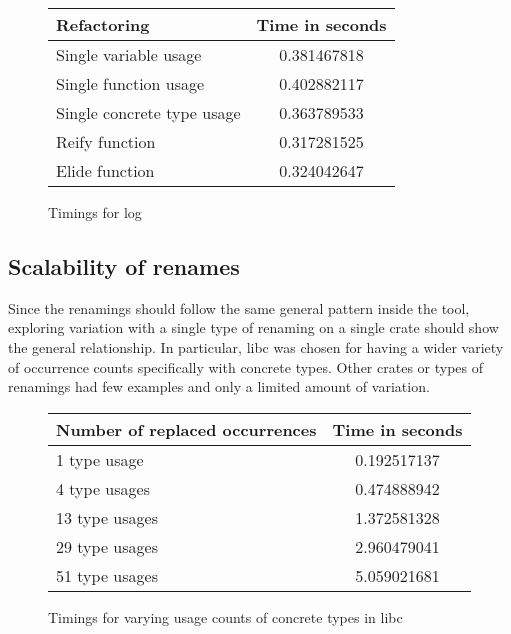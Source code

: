 \begin{figure}[H]
\begin{center}
    \begin{tabular}{ | l | c |}
    \hline
    \textbf{Refactoring} & \textbf{Time in seconds} \\ \hline
    Single variable usage &  0.381467818  \\ \hline
    Single function usage &   0.402882117  \\ \hline
    Single concrete type usage  &  0.363789533 \\ \hline
    Reify function &   0.317281525 \\ \hline
    Elide function &  0.324042647 \\ \hline
    \end{tabular}
\end{center}

\caption{Timings for log}
\label{Fig:log}
\end{figure}

\subsection{Scalability of renames}
Since the renamings should follow the same general pattern inside the tool, exploring variation with a single type of renaming on a single crate should show the general relationship. In particular, libc was chosen for having a wider variety of occurrence counts specifically with concrete types. Other crates or types of renamings had few examples and only a limited amount of variation.

\begin{figure}[H]
\begin{center}
    \begin{tabular}{ | l | c |}
    \hline
    \textbf{Number of replaced occurrences} & \textbf{Time in seconds} \\ \hline
    1 type usage &  0.192517137  \\ \hline
    4 type usages &   0.474888942  \\ \hline
    13 type usages  &  1.372581328 \\ \hline
    29 type usages &  2.960479041  \\ \hline
    51 type usages &  5.059021681 \\ \hline
    \end{tabular}
\end{center}

\caption{Timings for varying usage counts of concrete types in libc}
\label{Fig:scaling}
\end{figure}